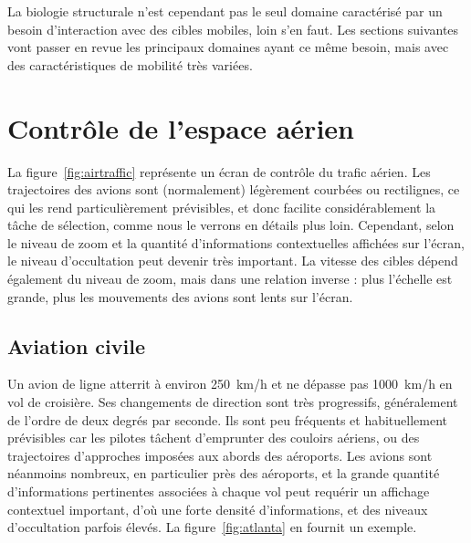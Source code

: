 	La biologie structurale n'est cependant pas le seul domaine caractérisé par un besoin d'interaction avec des cibles mobiles, loin s'en faut. Les sections suivantes vont passer en revue les principaux domaines ayant ce même besoin, mais avec des caractéristiques de mobilité très variées.
	
	
	\section{Contrôle de l'espace aérien}
 La figure~\ref{fig:airtraffic} représente un écran de contrôle du trafic aérien. Les trajectoires des avions sont (normalement) légèrement courbées ou rectilignes, ce qui les rend particulièrement prévisibles, et donc facilite considérablement la tâche de sélection, comme nous le verrons en détails plus loin. Cependant, selon le niveau de zoom et la quantité d'informations contextuelles affichées sur l'écran, le niveau d'occultation peut devenir très important. La vitesse des cibles dépend également du niveau de zoom, mais dans une relation inverse : plus l'échelle est grande, plus les mouvements des avions sont lents sur l'écran.
	
	\FloatBarrier \subsection{Aviation civile}
	Un avion de ligne atterrit à environ 250~km/h et ne dépasse pas 1000~km/h en vol de croisière. Ses changements de direction sont très progressifs, généralement de l'ordre de deux degrés par seconde. Ils sont peu fréquents et habituellement prévisibles car les pilotes tâchent d'emprunter des couloirs aériens, ou des trajectoires d'approches imposées aux abords des aéroports. Les avions sont néanmoins nombreux, en particulier près des aéroports, et la grande quantité d'informations pertinentes associées à chaque vol peut requérir un affichage contextuel important, d'où une forte densité d'informations, et des niveaux d'occultation parfois élevés. La figure~\ref{fig:atlanta} en fournit un exemple.
	
